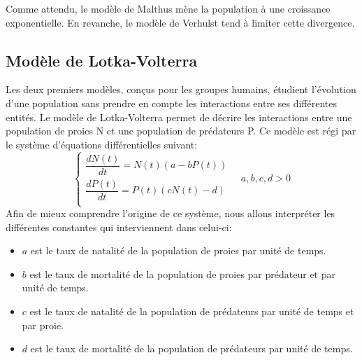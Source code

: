 \documentclass{article}
\begin{document}
Comme attendu, le modèle de Malthus mène la population à une croissance exponentielle. En revanche, le modèle de Verhulst tend à limiter cette divergence.
\subsection{Modèle de Lotka-Volterra}
Les deux premiers modèles, conçus pour les groupes humains, étudient l'évolution d'une population sans prendre en compte les interactions entre ses différentes entités. Le modèle de Lotka-Volterra permet de décrire les interactions entre une population de proies N et une population de prédateurs P. Ce modèle est régi par le système d'équations différentielles suivant:
\begin{equation}
\displaystyle\begin{cases}    \dfrac{dN(t)}{dt} = N(t) (a-bP(t)) \\[3mm]
\dfrac{dP(t)}{dt} = P(t) (cN(t)-d) \\    \end{cases} \quad a, b, c, d > 0
\end{equation}
Afin de mieux comprendre l'origine de ce système, nous allons interpréter les différentes constantes qui interviennent dans celui-ci:

\begin{itemize}
    \item $a$ est le taux de natalité de la population de proies par unité de temps.
    \item $b$ est le taux de mortalité de la population de proies par prédateur et par unité de temps.
    \item $c$ est le taux de natalité de la population de prédateurs par unité de temps et par proie.
    \item $d$ est le taux de mortalité de la population de prédateurs par unité de temps.
\end{itemize}


\newpage
\end{document}
